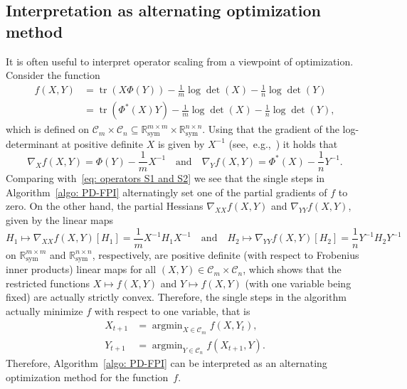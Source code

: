 \documentclass[a4paper]{article}
\newcommand{\R}{\mathbb{R}}
\newcommand{\caC}{\mathcal{C}}
\DeclareMathOperator{\tr}{tr}
\DeclareMathOperator{\argmin}{argmin}
\theoremstyle{definition}
\numberwithin{equation}{section}
\begin{document}
\subsection{Interpretation as alternating optimization method}\label{sec: alternating optimization}

It is often useful to interpret operator scaling from a viewpoint of optimization. Consider the function
\begin{equation}\label{eq: cost function}
\begin{aligned}
 f(X,Y) &= \tr (X \Phi(Y) ) -\frac{1}{m} \log \det (X) - \frac{1}{n} \log \det (Y) \\
&= \tr (\Phi^*(X) Y ) -\frac{1}{m} \log \det (X) - \frac{1}{n} \log \det (Y),
\end{aligned}
\end{equation}
which is defined on $\caC_m \times \caC_n \subseteq \R^{m \times m}_{\mathrm{sym}} \times \R^{n \times n}_{\mathrm{sym}}$. Using that the gradient of the log-determinant at positive definite $X$ is given by $X^{-1}$ (see,~e.g.,~\cite[Section~A.4.1]{Boyd2004}) it holds that
\[
 \nabla_X f(X,Y) = \Phi(Y) - \frac{1}{m} X^{-1} \quad \text{and} \quad \nabla_Y f(X,Y) = \Phi^*(X) - \frac{1}{n} Y^{-1}. 
\]
Comparing with~\eqref{eq: operators S1 and S2} we see that the single steps in Algorithm~\ref{algo: PD-FPI} alternatingly set one of the partial gradients of $f$ to zero. On the other hand, the partial Hessians $\nabla_{XX} f(X,Y)$ and $\nabla_{YY} f(X,Y)$, given by the linear maps
\begin{equation}\label{eq: partial Hessians}
 H_1 \mapsto \nabla_{XX} f(X,Y)[H_1] = \frac{1}{m} X^{-1} H_1 X^{-1} \quad \text{and} \quad H_2 \mapsto \nabla_{YY} f(X,Y)[H_2] = \frac{1}{n} Y^{-1} H_2 Y^{-1}
\end{equation}
on $\R^{m \times m}_{\mathrm{sym}}$ and $\R^{n \times n}_{\mathrm{sym}}$, respectively, are positive definite (with respect to Frobenius inner products) linear maps for all $(X,Y) \in \caC_m \times \caC_n$, which shows that the restricted functions $X \mapsto f(X,Y)$ and $Y \mapsto f(X,Y)$ (with one variable being fixed) are actually strictly convex. Therefore, the single steps in the algorithm actually minimize $f$ with respect to one variable, that is
\begin{align*}
 X_{t+1} &= \argmin_{X \in \caC_m} f(X, Y_t), \\
 Y_{t+1} &= \argmin_{Y \in \caC_n} f(X_{t+1}, Y).
\end{align*}
Therefore, Algorithm~\ref{algo: PD-FPI} can be interpreted as an alternating optimization method for the function~$f$. %
\end{document}
